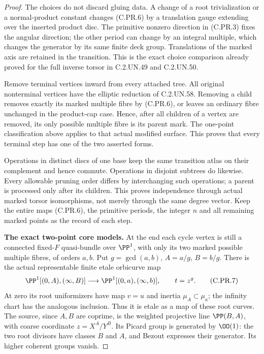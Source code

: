\begin{proof}
The choices do not discard gluing data. A change of a root
trivialization or a normal-product constant changes (C.PR.6) by
a translation gauge extending over the inserted product disc.
The primitive nonzero direction in (C.PR.3) fixes the angular
direction; the other period can change by an integral multiple,
which changes the generator by its same finite deck group.
Translations of the marked axis are retained in the transition.
This is the exact choice comparison already proved for the
full inverse torsor in C.2.UN.49 and C.2.UN.50.

Remove terminal vertices inward from every attached tree.
All original nonterminal vertices have the elliptic reduction
of C.2.UN.58. Removing a child removes exactly its marked
multiple fibre by (C.PR.6), or leaves an ordinary fibre unchanged
in the product-cap case. Hence, after all children of a vertex
are removed, its only possible multiple fibre is its parent
mark. The one-point classification above applies to that
actual modified surface. This proves that every terminal step
has one of the two asserted forms.

Operations in distinct discs of one base keep the same transition
atlas on their complement and hence commute. Operations in disjoint
subtrees do likewise. Every allowable pruning order differs by
interchanging such operations; a parent is processed only after
its children. This proves independence through actual marked
torsor isomorphisms, not merely through the same degree vector.
Keep the entire maps (C.PR.6), the primitive periods, the integer
$n$ and all remaining marked points as the record of each step.

\par\medskip\noindent\textbf{The exact two-point core models.}
At the end each cycle vertex is still a connected fixed-$F$
quasi-bundle over $\PP^1$, with only its two marked possible
multiple fibres, of orders $a,b$. Put $g=\gcd(a,b)$,
$A=a/g$, $B=b/g$. There is the actual representable finite
etale orbicurve map
\[
 \PP^1[(0,A),(\infty,B)]
       \longrightarrow \PP^1[(0,a),(\infty,b)],
                         \qquad t=z^g .                \tag{C.PR.7}
\]
At zero its root uniformizers have map $v=u$ and inertia
$\mu_A\subset\mu_a$; the infinity chart has the analogous
inclusion. Thus it is etale as a map of these root curves.
The source, since $A,B$ are coprime, is the weighted projective
line $\PP(B,A)$, with coarse coordinate
$z=X^A/Y^B$. Its Picard group is generated by $\OO(1)$:
the two root divisors have classes $B$ and $A$, and Bezout
expresses their generator. Its higher coherent groups vanish.


\end{proof}

